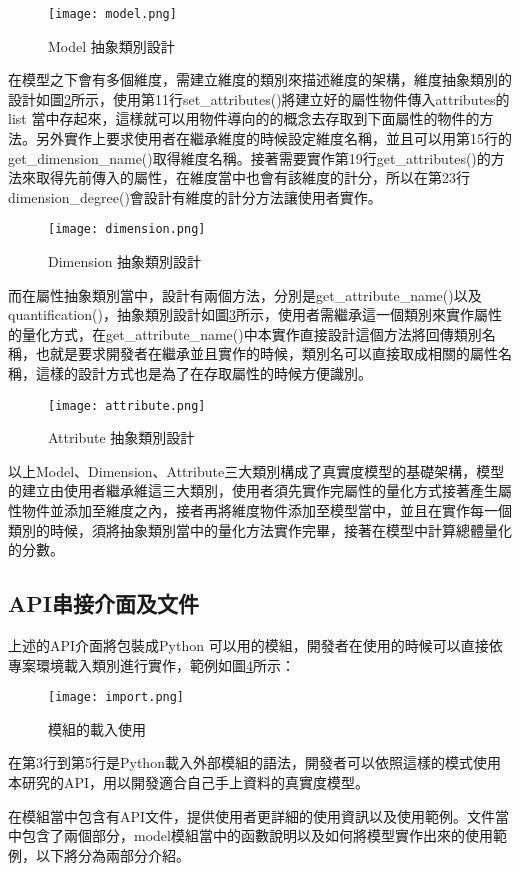 \begin{figure}[H]
\centering
\graphicspath{{/Users/FUDA/Documents/masterThesis/image/}}
\texttt{[image: model.png]}
\caption{Model 抽象類別設計}
\label{model}
\end{figure}

在模型之下會有多個維度，需建立維度的類別來描述維度的架構，維度抽象類別的設計如圖\ref{dimension}所示，使用第11行set\_attributes()將建立好的屬性物件傳入attributes的 list 當中存起來，這樣就可以用物件導向的的概念去存取到下面屬性的物件的方法。另外實作上要求使用者在繼承維度的時候設定維度名稱，並且可以用第15行的get\_dimension\_name()取得維度名稱。接著需要實作第19行get\_attributes()的方法來取得先前傳入的屬性，在維度當中也會有該維度的計分，所以在第23行dimension\_degree()會設計有維度的計分方法讓使用者實作。

\begin{figure}[H]
\centering
\graphicspath{{/Users/FUDA/Documents/masterThesis/image/}}
\texttt{[image: dimension.png]}
\caption{Dimension 抽象類別設計}
\label{dimension}
\end{figure}

而在屬性抽象類別當中，設計有兩個方法，分別是get\_attribute\_name()以及quantification()，抽象類別設計如圖\ref{attribute}所示，使用者需繼承這一個類別來實作屬性的量化方式，在get\_attribute\_name()中本實作直接設計這個方法將回傳類別名稱，也就是要求開發者在繼承並且實作的時候，類別名可以直接取成相關的屬性名稱，這樣的設計方式也是為了在存取屬性的時候方便識別。\\\par
\newpage
\begin{figure}[H]
\centering
\graphicspath{{/Users/FUDA/Documents/masterThesis/image/}}
\texttt{[image: attribute.png]}
\caption{Attribute 抽象類別設計}
\label{attribute}
\end{figure}
以上Model、Dimension、Attribute三大類別構成了真實度模型的基礎架構，模型的建立由使用者繼承維這三大類別，使用者須先實作完屬性的量化方式接著產生屬性物件並添加至維度之內，接者再將維度物件添加至模型當中，並且在實作每一個類別的時候，須將抽象類別當中的量化方法實作完畢，接著在模型中計算總體量化的分數。\\\par
\subsection{API串接介面及文件}
上述的API介面將包裝成Python 可以用的模組，開發者在使用的時候可以直接依專案環境載入類別進行實作，範例如圖\ref{import}所示：
\begin{figure}[H]
\centering
\graphicspath{{/Users/FUDA/Documents/masterThesis/image/}}
\texttt{[image: import.png]}
\caption{模組的載入使用}
\label{import}
\end{figure}
在第3行到第5行是Python載入外部模組的語法，開發者可以依照這樣的模式使用本研究的API，用以開發適合自己手上資料的真實度模型。\\\par
在模組當中包含有API文件，提供使用者更詳細的使用資訊以及使用範例。文件當中包含了兩個部分，model模組當中的函數說明以及如何將模型實作出來的使用範例，以下將分為兩部分介紹。\\\par


